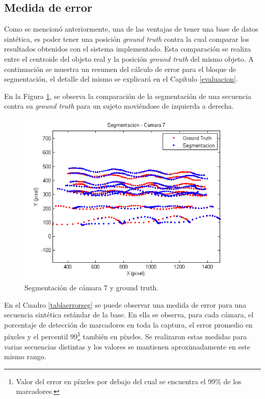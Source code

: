 \subsection{Medida de error}

Como se mencionó anteriormente, una de las ventajas de tener una base de datos sintética, es poder tener una posición \textit{ground truth} contra la cual comparar los resultados obtenidos con el sistema implementado. Esta comparación se realiza entre el centroide del objeto real y la posición \textit{ground truth} del mismo objeto. A continuación se muestra un resumen del cálculo de error para el bloque de segmentación, el detalle del mismo se explicará en el Capítulo \ref{evaluacion}. 

En la Figura \ref{ejMedErr}, se observa la comparación de la segmentación de una secuencia contra su \textit{ground truth} para un sujeto moviéndose de izquierda a derecha.

\vspace{-3mm}

\begin{figure}[ht!]
\begin{center}
\includegraphics[scale=0.6]{img/imagen_segmentacion_cam7_8_07_100_200.png}
\end{center}
\vspace{-7mm}
\caption{Segmentación de cámara 7 y ground truth.}
\label{ejMedErr}
\end{figure}

En el Cuadro \ref{tablaerrorseg} se puede observar una medida de error para una secuencia sintética estándar de la base. En ella se observa, para cada cámara, el porcentaje de detección de marcadores en toda la captura, el error promedio en píxeles y el percentil 99\footnote{Valor del error en píxeles por debajo del cual se encuentra el 99\% de los marcadores.} también en píxeles. Se realizaron estas medidas para varias secuencias distintas y los valores se mantienen aproximadamente en este mismo rango.

